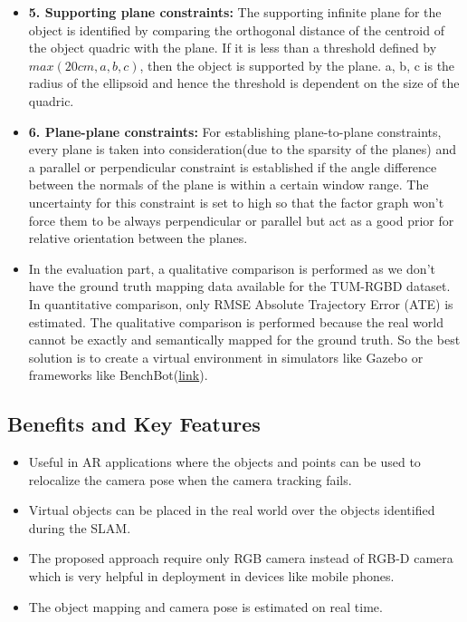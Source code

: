 \documentclass{article}
\begin{document}
\begin{itemize}
\item \textbf{5. Supporting plane constraints: } The supporting infinite plane for the object is identified by comparing the orthogonal distance of the centroid of the object quadric with the plane. If it is less than a threshold defined by $max(20cm, a, b, c)$, then the object is supported by the plane. a, b, c is the radius of the ellipsoid and hence the threshold is dependent on the size of the quadric.

\item \textbf{6. Plane-plane constraints: } For establishing plane-to-plane constraints, every plane is taken into consideration(due to the sparsity of the planes) and a parallel or perpendicular constraint is established if the angle difference between the normals of the plane is within a certain window range. The uncertainty for this constraint is set to high so that the factor graph won't force them to be always perpendicular or parallel but act as a good prior for relative orientation between the planes.


\item In the evaluation part, a qualitative comparison is performed as we don't have the ground truth mapping data available for the TUM-RGBD dataset. In quantitative comparison, only RMSE Absolute Trajectory Error (ATE) is estimated. The qualitative comparison is performed because the real world cannot be exactly and semantically mapped for the ground truth. So the best solution is to create a virtual environment in simulators like Gazebo or frameworks like BenchBot(\href{https://github.com/qcr/benchbot}{link}).

\end{itemize}







\subsection{Benefits and Key Features}

\begin{itemize}
    \item Useful in AR applications where the objects and points can be used to relocalize the camera pose when the camera tracking fails.
    \item Virtual objects can be placed in the real world over the objects identified during the SLAM.
    \item The proposed approach require only RGB camera instead of RGB-D camera which is very helpful in deployment in devices like mobile phones.
    \item The object mapping and camera pose is estimated on real time.
\end{itemize}




\end{document}
